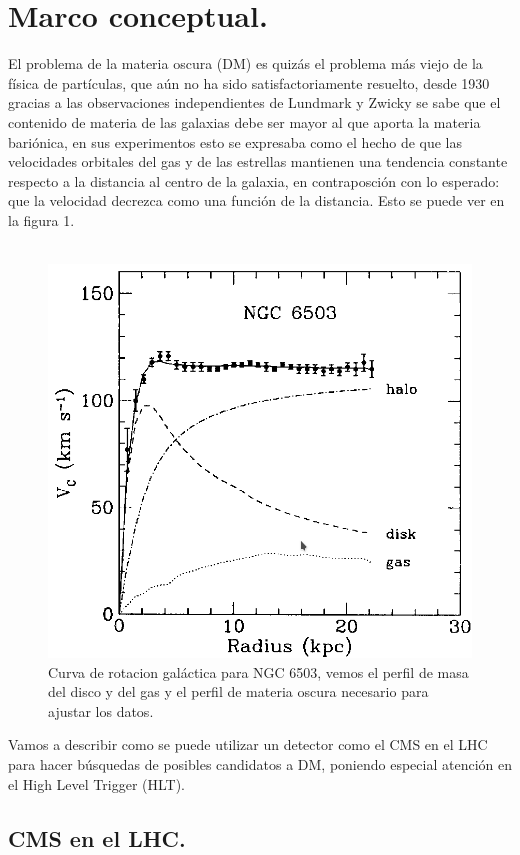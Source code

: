 \section{Marco conceptual.}
El problema de la materia oscura (DM) es quizás el problema más viejo de la física de partículas, que aún no ha sido satisfactoriamente resuelto, desde 1930 gracias a las observaciones independientes de Lundmark y Zwicky se sabe que el contenido de materia de las galaxias debe ser mayor al que aporta la materia bariónica, en sus experimentos esto se expresaba como el hecho de que las velocidades orbitales del gas y de las estrellas mantienen una tendencia constante respecto a la distancia al centro de la galaxia, en contraposción con lo esperado: que la velocidad decrezca como una función de la distancia. Esto se puede ver en la figura 1.
\\
\\
\begin{figure}
\centering
\includegraphics[width=12cm]{F1.png}
\caption{\label{fig:frog} Curva de rotacion galáctica para NGC 6503, vemos el perfil de masa del disco y del gas y el perfil de materia oscura necesario para ajustar los datos.}
\end{figure}
Vamos a describir como se puede utilizar un detector como el CMS en el LHC para hacer búsquedas de posibles candidatos a DM, poniendo especial atención en el High Level Trigger (HLT).


\label{sec:examples}

\subsection{CMS en el LHC.}

